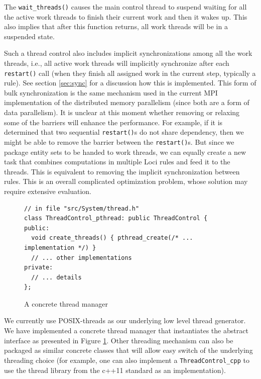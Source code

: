 \documentclass{article}
\begin{document}
The \lstinline{wait_threads()} causes the main control thread to suspend
waiting for all the active work threads to finish their current
work and then it wakes up.  This also implies that after this function
returns, all work threads will be in a suspended state.

Such a thread control also includes implicit synchronizations among
all the work threads, i.e., all active work threads will
implicitly synchronize after each \lstinline{restart()} call (when they
finish all assigned work in the current step, typically a rule).  See
section \ref{sec:sync} for a discussion how this is implemented.  This
form of bulk synchronization is the same mechanism used in the current
MPI implementation of the distributed memory parallelism (since both are
a form of data parallelism).  It is unclear at this moment whether
removing or relaxing some of the barriers will enhance the performance.
For example, if it is determined that two sequential
\lstinline{restart()}s do not share dependency, then we might be able to
remove the barrier between the \lstinline{restart()}s.  But since we
package entity sets to be handed to work threads, we can equally
create a new task that combines computations in multiple Loci rules and
feed it to the threads.  This is equivalent to removing the implicit
synchronization between rules.  This is an overall complicated
optimization problem, whose solution may require extensive evaluation.

\begin{figure}[h]
  \begin{lstlisting}
// in file "src/System/thread.h"
class ThreadControl_pthread: public ThreadControl {
public:
  void create_threads() { pthread_create(/* ... implementation */) }
  // ... other implementations
private:
  // ... details
};
  \end{lstlisting}
  \caption{A concrete thread manager\label{fig:tm-pthread}}
\end{figure}

We currently use POSIX-threads as our underlying low level thread
generator. We have implemented a concrete thread manager that
instantiates the abstract interface as presented in Figure
\ref{fig:tm-pthread}.  Other threading mechanism can also be packaged as
similar concrete classes that will allow easy switch of the underlying
threading choice (for example, one can also implement a
\lstinline{ThreadControl_cpp} to use the thread library from the c++11
standard as an implementation).

\end{document}
